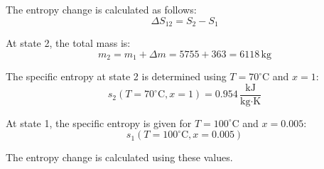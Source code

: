 The entropy change is calculated as follows:  
\[
\Delta S_{12} = S_2 - S_1
\]  

At state 2, the total mass is:  
\[
m_2 = m_1 + \Delta m = 5755 + 363 = 6118 \, \text{kg}
\]  

The specific entropy at state 2 is determined using \( T = 70^\circ\text{C} \) and \( x = 1 \):  
\[
s_2(T=70^\circ\text{C}, x=1) = 0.954 \, \frac{\text{kJ}}{\text{kg·K}}
\]  

At state 1, the specific entropy is given for \( T = 100^\circ\text{C} \) and \( x = 0.005 \):  
\[
s_1(T=100^\circ\text{C}, x=0.005)
\]  

The entropy change is calculated using these values.